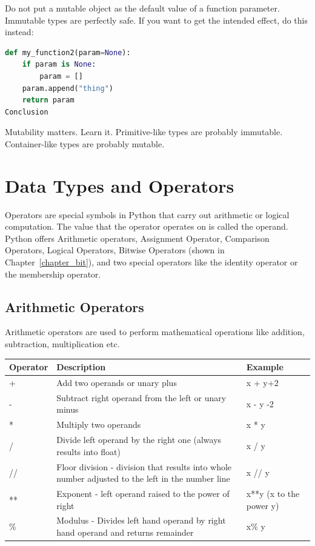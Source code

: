 \documentclass[../main.tex]{subfiles}
\begin{document}
Do not put a mutable object as the default value of a function parameter. Immutable types are perfectly safe. If you want to get the intended effect, do this instead:
\begin{lstlisting}[language = Python]
def my_function2(param=None):
    if param is None:
        param = []
    param.append("thing")
    return param
Conclusion
\end{lstlisting}

Mutability matters. Learn it. Primitive-like types are probably immutable. Container-like types are probably mutable.
\section{Data Types and Operators}

Operators are special symbols in Python that carry out arithmetic or logical computation. The value that the operator operates on is called the operand. Python offers  Arithmetic operators, Assignment Operator, Comparison Operators, Logical Operators, Bitwise Operators (shown in Chapter~\ref{chapter_bit}), and two special operators like the identity operator or the membership operator. 
\subsection{Arithmetic Operators}
Arithmetic operators are used to perform mathematical operations like addition, subtraction, multiplication etc. 
\begin{table}[h]
\begin{small}
\centering
\noindent{}
 \noindent \begin{tabular}{|p{}|p{}| p{}| }
  \hline
Operator& Description & Example  \\ \hline

+ &	Add two operands or unary plus & 	x + y+2\\ \hline
- &	Subtract right operand from the left or unary minus  &	x - y -2\\ \hline
* 	& Multiply two operands  &	x * y\\ \hline
/ 	& Divide left operand by the right one (always results into float) &	x / y \\ \hline
// &	Floor division - division that results into whole number adjusted to the left in the number line  &	x // y \\ \hline
** &	Exponent - left operand raised to the power of right &	x**y (x to the power y)\\ \hline
\%  & Modulus - Divides left hand operand by right hand operand and returns remainder & x\% y
\end{tabular}
  \label{tab:arithematic_operators}
  \end{small}
\end{table}
\end{document}
